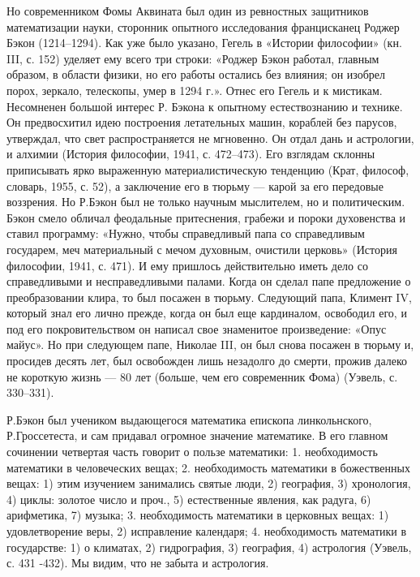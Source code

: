 Но  современником  Фомы Аквината  был  один  из ревностных  защитников
математизации  науки,  сторонник  опытного  исследования  францисканец
Роджер Бэкон  (1214--1294). Как  уже было  указано, Гегель  в «Истории
философии» (кн.  III, с.  152) уделяет ему  всего три  строки: «Роджер
Бэкон  работал,  главным образом,  в  области  физики, но  его  работы
остались без  влияния; он  изобрел порох,  зеркало, телескопы,  умер в
1294 г.». Отнес его Гегель и к мистикам. Несомненен большой интерес Р.
Бэкона  к  опытному естествознанию  и  технике.  Он предвосхитил  идею
построения  летательных машин,  кораблей без  парусов, утверждал,  что
свет  распространяется не  мгновенно. Он  отдал дань  и астрологии,  и
алхимии (История  философии, 1941, с. 472--473).  Его взглядам склонны
приписывать  ярко   выраженную  материалистическую   тенденцию  (Крат,
философ, словарь, 1955, с. 52), а заключение его в тюрьму --- карой за
его передовые воззрения. Но Р.Бэкон  был не только научным мыслителем,
но и политическим. Бэкон смело обличал феодальные притеснения, грабежи
и пороки  духовенства и  ставил программу: «Нужно,  чтобы справедливый
папа  со справедливым  государем, меч  материальный с  мечом духовным,
очистили церковь»  (История философии, 1941,  с. 471). И  ему пришлось
действительно иметь  дело со  справедливыми и  несправедливыми палами.
Когда  он  сделал папе  предложение  о  преобразовании клира,  то  был
посажен  в  тюрьму.  Следующий  папа, Климент  IV,  который  знал  его
лично  прежде, когда  он  был  еще кардиналом,  освободил  его, и  под
его покровительством  он написал  свое знаменитое  произведение: «Опус
майус». Но  при следующем папе,  Николае III,  он был снова  посажен в
тюрьму  и,  просидев десять  лет,  был  освобожден лишь  незадолго  до
смерти, прожив  далеко не короткую жизнь  --- 80 лет (больше,  чем его
современник Фома) (Уэвель, с. 330--331).

Р.Бэкон  был учеником  выдающегося математика  епископа линкольнского,
Р.Гроссетеста,  и сам  придавал  огромное значение  математике. В  его
главном  сочинении четвертая  часть  говорит о  пользе математики:  1.
необходимость  математики  в   человеческих  вещах;  2.  необходимость
математики в  божественных вещах: 1) этим  изучением занимались святые
люди, 2) география, 3) хронология, 4) циклы: золотое число и проч., 5)
естественные  явления,  как  радуга,  6)  арифметика,  7)  музыка;  3.
необходимость математики в церковных вещах: 1) удовлетворение веры, 2)
исправление календаря; 4. необходимость математики в государстве: 1) о
климатах, 2) гидрография, 3) география,  4) астрология (Уэвель, с. 431
-432). Мы видим, что не забыта и астрология.


